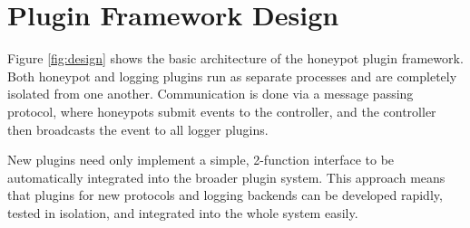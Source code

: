 \section*{\color{NavyBlue}Plugin Framework Design}

\large

\vspace{2cm}

\begin{center}
{
\scalebox{1.75}{}
}
\label{fig:design}
\end{center}

\vspace{2cm}

Figure \ref{fig:design} shows the basic architecture of the honeypot plugin
framework. Both honeypot and logging plugins run as separate processes
and are completely isolated from one another. Communication is done via a
message passing protocol, where honeypots submit events to the controller,
and the controller then broadcasts the event to all logger plugins.

New plugins need only implement a simple, 2-function interface to be
automatically integrated into the broader plugin system. This approach
means that plugins for new protocols and logging backends can be developed
rapidly, tested in isolation, and integrated into the whole system easily.
